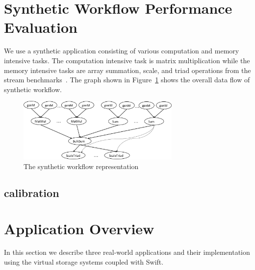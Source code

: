 \documentclass[10pt,journal,cspaper,compsoc]{IEEEtran}
\newcommand{\katznote}[1]{ {\textcolor{blue}    { ***Dan:      #1 }}}
\newcommand{\katznote}[1]{}
\begin{document}
\section{Synthetic Workflow Performance Evaluation}
We use a synthetic application consisting of
various computation and memory intensive tasks. The computation intensive task
is matrix multiplication while the memory intensive tasks are array summation,
scale, and triad operations from the stream benchmarks~\cite{Stream}.  The
graph shown in Figure~\ref{fig:synthetic} shows the overall data flow of
synthetic workflow. 

\begin{figure}[ht!]
\begin{center}
\includegraphics[width=8cm]{figures/synthetic_combine.png}
\caption{The synthetic workflow representation}
\label{fig:synthetic}
\end{center}
\end{figure}

\subsection{calibration}

\section{Application Overview}\label{sec:app}
In this section we describe three real-world applications and their
implementation using the virtual storage systems coupled with Swift. 
\end{document}
